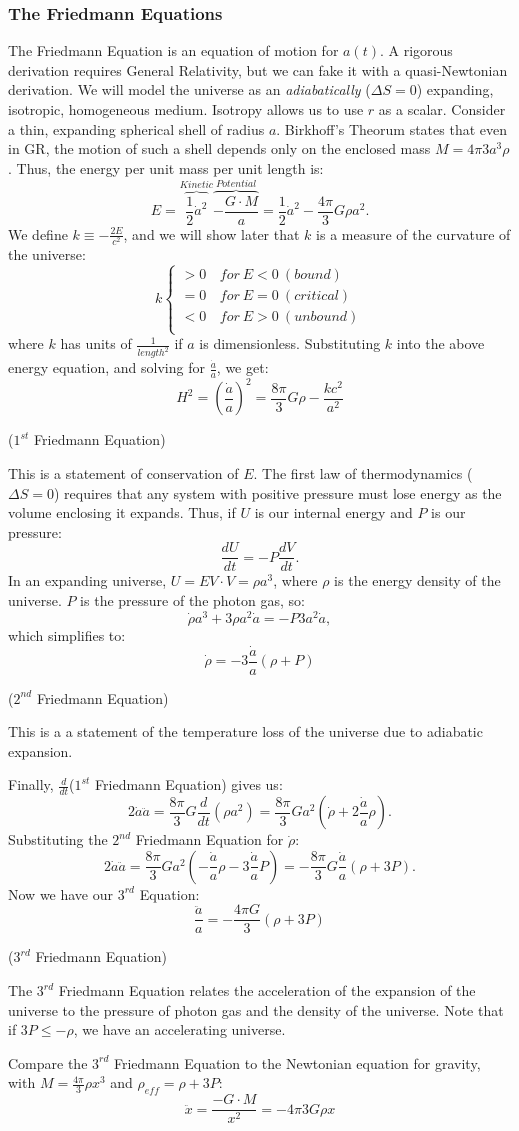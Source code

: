 \documentclass{article}
\def\hf{\frac12}
\def\inv#1{\frac{1}{ #1}}
\def\ddt{\frac{d}{dt}}
\def\aa{\frac{\dot a }{ a}}
\def\ddt{\frac{d}{dt}}
\def\epot{\frac{8\pi}{ 3}}
\def\hf{\frac12}
\def\ddt{{\frac{d}{dt}}}
\def\paap{\left(\aa\right)}
\begin{document}
\subsubsection{ The Friedmann Equations}

The Friedmann Equation is an equation of motion for $a(t)$.  A rigorous
derivation requires General Relativity, but we can fake it with a
quasi-Newtonian derivation.
We will model the universe as an {\it adiabatically} ($\Delta S=0$) expanding,
isotropic, homogeneous medium.  Isotropy allows us to use $r$ as a scalar.
Consider a thin, expanding spherical shell of radius $a$.
Birkhoff's Theorum states that even in GR,
the motion of such a shell depends only on the enclosed mass 
$M={4\pi }{ 3}a^3\rho$.
Thus, the energy per unit mass per unit length is:
$$E=\overbrace{\hf \dot a^2}^{Kinetic}\overbrace{-\frac{G\cdot M}{ a}}^{Potential}
=\hf \dot a^2-\frac{4\pi }{ 3}G\rho a^2.$$
We define $k\equiv-\frac{2E}{ c^2}$, and we will show later that $k$ is a measure
of the curvature of the universe: 
$$k\begin{cases}
>0&\,for\ E<0\ (bound)\\
=0&\,for\ E=0\ (critical)\\
<0&\,for\ E>0\ (unbound)\\\end{cases}$$
where $k$ has units of $\inv{length^2}$ if $a$ is dimensionless.  Substituting
$k$ into the above energy equation, and solving for $\aa$, we get:
\def\paap{\left(\aa\right)}
$$\boxed{H^2=\paap^2=\epot G\rho -\frac{k c^2 }{ a^2}}$$
\centerline{($1^{st}$ Friedmann Equation)}
This is a statement of conservation of $E$.
The first law of thermodynamics ($\Delta S=0$) requires that any 
system with positive pressure must lose energy as the volume enclosing it
expands.  Thus, if $U$ is our internal energy and $P$ is our pressure:
$$\frac{dU}{ dt}=-P\frac{dV}{ dt}.$$  
In an expanding universe, $U={E}{ V}\cdot V=\rho a^3$, where $\rho$ is the
energy density of the universe.  $P$ is the pressure of the photon gas, so:
$$\dot \rho a^3+3\rho a^2\dot a=-P 3a^2\dot a,$$ 
which simplifies to:
$$\boxed{\dot \rho=-3\aa(\rho +P)}$$
\centerline{($2^{nd}$ Friedmann Equation)}
This is a a statement of the temperature loss of the universe 
due to adiabatic expansion.\par
Finally, $\ddt$($1^{st}$ Friedmann Equation) gives us:
$$2\dot a\ddot a=\epot G \frac{d }{ dt}(\rho a^2) =\epot G a^2(\dot \rho +2\aa \rho).$$
Substituting the $2^{nd}$ Friedmann Equation for $\dot \rho$:
$$2\dot a\ddot a=\epot Ga^2 (-\aa \rho -3 \aa P) =-\epot G \aa (\rho +3P).$$  
Now we have our $3^{rd}$ Equation:
$$\boxed{\frac{\ddot {a }}{ a}=-\frac{4\pi G} {3} (\rho + 3P)}$$
\centerline{($3^{rd}$ Friedmann Equation)}
The $3^{rd}$ Friedmann Equation relates the acceleration of the expansion of
the universe to the pressure of photon gas and the density of the universe.
Note that if $3P \le -\rho$, we have an accelerating universe.\par
Compare the $3^{rd}$ Friedmann Equation to the Newtonian equation for gravity,
with $M=\frac{4\pi }{ 3}\rho x^3$ and $\rho_{eff}=\rho +3P$:
$$\ddot x=\frac{-G\cdot M}{ x^2}={-4\pi }{ 3}G\rho x$$
\end{document}
